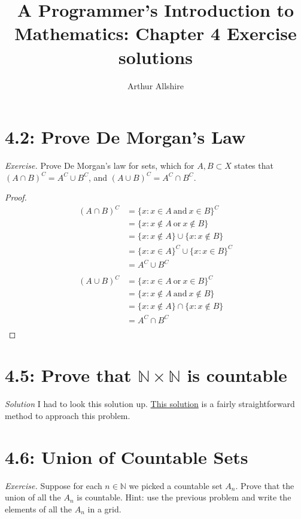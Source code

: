 \documentclass{article}
\author{Arthur Allshire}
\title{A Programmer's Introduction to Mathematics: Chapter 4 Exercise solutions}
\begin{document}
\maketitle

\section*{4.2: Prove De Morgan's Law}
{\it Exercise.} Prove De Morgan's law for sets, which for $A, B \subset X$
states that $(A \cap B)^{C} = A^{C} \cup B^{C}$, and
$(A \cup B)^{C} = A^{C} \cap B^{C}$.

\begin{proof}

\[
\begin{aligned}
    (A \cap B)^{C} &= \{x : x \in A \:\text{and}\: x \in B\}^{C} \\
             &= \{x : x \not\in A \:\text{or}\: x \not\in B\} \\
             &= \{x : x \not\in A\} \cup \{x: x \not\in B\} \\
             &= \{x : x \in A\}^C \cup \{x: x \in B\}^C \\
             &= A^C \cup B^C \\
\\
    (A \cup B)^{C} &= \{x : x \in A \:\text{or}\: x \in B\}^{C} \\
             &= \{x : x \not\in A \:\text{and}\: x \not\in B\} \\
             &= \{x : x \not\in A\} \cap \{x:  x \not\in B\} \\
             &= A^C \cap B^C \\
\end{aligned}
\]

\end{proof}

\section*{4.5: Prove that $\mathbb{N}\times\mathbb{N}$ is countable}

{\it Solution} I had to look this solution up.
\href{https://math.stackexchange.com/questions/91665/proving-mathbbnk-is-countable/91678#91678}{This solution}
is a fairly straightforward method to approach this problem.

\section*{4.6: Union of Countable Sets}
{\it Exercise.} Suppose for each $n \in \mathbb{N}$ we picked a countable set $A_n$. Prove that
the union of all the $A_n$ is countable. Hint: use the previous problem and write the elements of all the
$A_n$ in a grid.
\end{document}
